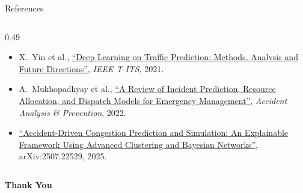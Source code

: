 \begin{frame}{References}
\begin{columns}[T]
\begin{column}{0.49\textwidth}
\begin{itemize}
        \item X.\ Yin et al., \href{https://arxiv.org/abs/2004.08555}{``Deep Learning on Traffic Prediction: Methods, Analysis and Future Directions''}, \emph{IEEE T-ITS}, 2021.
        \item A.\ Mukhopadhyay et al., \href{https://arxiv.org/abs/2006.04200}{``A Review of Incident Prediction, Resource Allocation, and Dispatch Models for Emergency Management''}, \emph{Accident Analysis \& Prevention}, 2022.
        \item \href{https://arxiv.org/abs/2507.22529}{``Accident-Driven Congestion Prediction and Simulation: An Explainable Framework Using Advanced Clustering and Bayesian Networks''}, arXiv:2507.22529, 2025.
      \end{itemize}
    \end{column}
  \end{columns}
\end{frame}

\begin{frame}[plain]
  \vfill
  \centering
  {\Huge\bfseries\color{astramInk} Thank You}
  \vfill
\end{frame}
